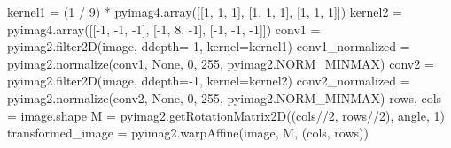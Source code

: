 \documentclass[12pt,a4paper]{article}
\newenvironment{Shaded}{\begin{snugshade}}{\end{snugshade}}
\newcommand{\DecValTok}[1]{\textcolor[rgb]{0.68,0.00,0.00}{#1}}
\newcommand{\NormalTok}[1]{\textcolor[rgb]{0.00,0.23,0.31}{#1}}
\newcommand{\OperatorTok}[1]{\textcolor[rgb]{0.37,0.37,0.37}{#1}}
\newcommand{\VariableTok}[1]{\textcolor[rgb]{0.07,0.07,0.07}{#1}}
\begin{document}
\begin{Shaded}
\begin{Highlighting}[numbers=left,,]

\NormalTok{kernel1 }\OperatorTok{=}\NormalTok{ (}\DecValTok{1} \OperatorTok{/} \DecValTok{9}\NormalTok{) }\OperatorTok{*}\NormalTok{ pyimag4.array([[}\DecValTok{1}\NormalTok{, }\DecValTok{1}\NormalTok{, }\DecValTok{1}\NormalTok{], [}\DecValTok{1}\NormalTok{, }\DecValTok{1}\NormalTok{, }\DecValTok{1}\NormalTok{], [}\DecValTok{1}\NormalTok{, }\DecValTok{1}\NormalTok{, }\DecValTok{1}\NormalTok{]])}
\NormalTok{kernel2 }\OperatorTok{=}\NormalTok{ pyimag4.array([[}\OperatorTok{{-}}\DecValTok{1}\NormalTok{, }\OperatorTok{{-}}\DecValTok{1}\NormalTok{, }\OperatorTok{{-}}\DecValTok{1}\NormalTok{], [}\OperatorTok{{-}}\DecValTok{1}\NormalTok{, }\DecValTok{8}\NormalTok{, }\OperatorTok{{-}}\DecValTok{1}\NormalTok{], [}\OperatorTok{{-}}\DecValTok{1}\NormalTok{, }\OperatorTok{{-}}\DecValTok{1}\NormalTok{, }\OperatorTok{{-}}\DecValTok{1}\NormalTok{]])}
\NormalTok{conv1 }\OperatorTok{=}\NormalTok{ pyimag2.filter2D(image, ddepth}\OperatorTok{={-}}\DecValTok{1}\NormalTok{, kernel}\OperatorTok{=}\NormalTok{kernel1)}
\NormalTok{conv1\_normalized }\OperatorTok{=}\NormalTok{ pyimag2.normalize(conv1,}
                        \VariableTok{None}\NormalTok{, }
                        \DecValTok{0}\NormalTok{, }
                        \DecValTok{255}\NormalTok{, }
\NormalTok{                        pyimag2.NORM\_MINMAX)}
\NormalTok{conv2 }\OperatorTok{=}\NormalTok{ pyimag2.filter2D(image, ddepth}\OperatorTok{={-}}\DecValTok{1}\NormalTok{, kernel}\OperatorTok{=}\NormalTok{kernel2)}
\NormalTok{conv2\_normalized }\OperatorTok{=}\NormalTok{ pyimag2.normalize(conv2,}
                        \VariableTok{None}\NormalTok{, }
                        \DecValTok{0}\NormalTok{, }
                        \DecValTok{255}\NormalTok{, }
\NormalTok{                        pyimag2.NORM\_MINMAX)}
\NormalTok{rows, cols }\OperatorTok{=}\NormalTok{ image.shape}
\NormalTok{M }\OperatorTok{=}\NormalTok{ pyimag2.getRotationMatrix2D((cols}\OperatorTok{//}\DecValTok{2}\NormalTok{, rows}\OperatorTok{//}\DecValTok{2}\NormalTok{), angle, }\DecValTok{1}\NormalTok{)}
\NormalTok{transformed\_image }\OperatorTok{=}\NormalTok{ pyimag2.warpAffine(image, M, (cols, rows))}
\end{Highlighting}
\end{Shaded}
\end{document}
